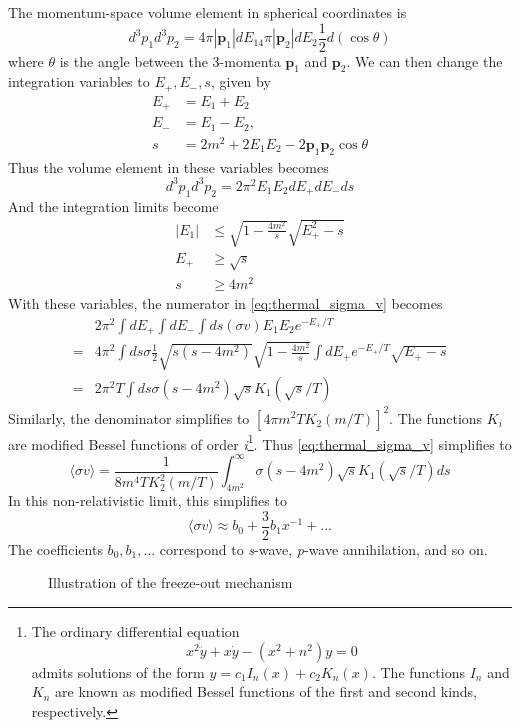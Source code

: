 The momentum-space volume element in spherical coordinates is
\[d^3p_1d^3p_2 = 4\pi |\mathbf{p}_1|dE_14\pi |\mathbf{p}_2|dE_2\frac{1}{2}d(\cos\theta)\]
where $\theta$ is the angle between the 3-momenta $\mathbf{p}_1$ and $\mathbf{p}_2$. We can then change the integration variables to $E_+, E_-, s$, given by
\begin{align}
  E_+ &= E_1 + E_2\\
  E_- &= E_1 - E_2,\\
  s &= 2m^2 + 2E_1E_2-2\mathbf{p}_1\mathbf{p}_2\cos\theta
\end{align}
Thus the volume element in these variables becomes
\[d^3p_1d^3p_2 = 2\pi^2E_1E_2dE_+dE_-ds\]
And the integration limits become
\begin{align}
  |E_1| &\leq \sqrt{1-\frac{4m^2}{s}}\sqrt{E_+^2 - s}\\
  E_+ &\geq \sqrt{s}\\
  s &\geq 4m^2
\end{align}
With these variables, the numerator in \autoref{eq:thermal_sigma_v} becomes
\begin{align*}
  &2\pi^2\int dE_+\int dE_-\int ds(\sigma v)E_1E_2e^{-E_+/T}\\
  =&4\pi^2\int ds\sigma \frac{1}{2}\sqrt{s(s-4m^2)}\sqrt{1-\frac{4m^2}{s}}\int dE_+e^{-E_+/T}\sqrt{E_+-s}\\
  =&2\pi^2T\int ds\sigma(s-4m^2)\sqrt{s}K_1(\sqrt{s}/T)
\end{align*}
Similarly, the denominator simplifies to $[4\pi m^2TK_2(m/T)]^2$. The functions $K_i$ are modified Bessel functions of order \emph{i}\footnote{The ordinary differential equation
  \begin{equation*}
    x^2\ddot{y} + x\dot{y} - (x^2+n^2)y = 0
  \end{equation*}
  admits solutions of the form $y = c_1 I_n(x) + c_2K_n(x)$. The functions $I_n$ and $K_n$ are known as modified Bessel functions of the first and second kinds, respectively.
}. Thus \autoref{eq:thermal_sigma_v} simplifies to
\[\langle\sigma v\rangle = \frac{1}{8m^4TK_2^2(m/T)}\int_{4m^2}^\infty\sigma(s-4m^2)\sqrt{s}K_1(\sqrt{s}/T)ds\]
In this non-relativistic limit, this simplifies to
\[\langle\sigma v\rangle \approx b_0 + \frac{3}{2}b_1x^{-1} + ...\]
The coefficients $b_0, b_1, ...$ correspond to \emph{s}-wave, \emph{p}-wave annihilation, and so on.
\begin{figure}
  \begin{sidecaption}{Illustration of the freeze-out mechanism}
    
\end{sidecaption}
\end{figure}
